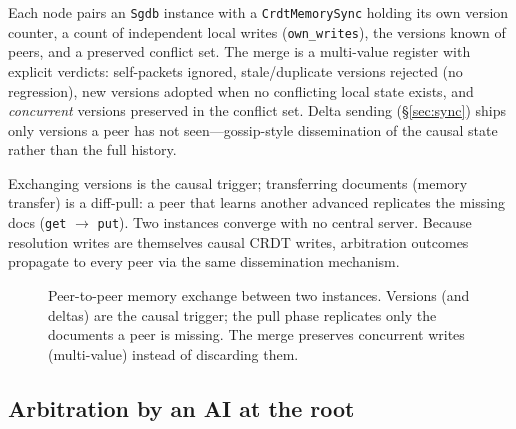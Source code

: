 \documentclass[11pt,twocolumn]{article}
\begin{document}
Each node pairs an \texttt{Sgdb} instance with a \texttt{CrdtMemorySync}
holding its own version counter, a count of independent local writes
(\texttt{own\_writes}), the versions known of peers, and a preserved conflict
set. The merge is a multi-value register with explicit verdicts:
self-packets ignored, stale/duplicate versions rejected (no regression), new
versions adopted when no conflicting local state exists, and \emph{concurrent}
versions preserved in the conflict set. Delta sending
(\S\ref{sec:sync}) ships only versions a peer has not seen---gossip-style
dissemination of the causal state rather than the full history.

Exchanging versions is the causal trigger; transferring documents (memory
transfer) is a diff-pull: a peer that learns another advanced replicates the
missing docs (\texttt{get} $\to$ \texttt{put}). Two instances converge with no
central server. Because resolution writes are themselves causal CRDT writes,
arbitration outcomes propagate to every peer via the same dissemination
mechanism.

\begin{figure}[t]
\centering
{}
\caption{Peer-to-peer memory exchange between two instances. Versions (and
deltas) are the causal trigger; the pull phase replicates only the documents a
peer is missing. The merge preserves concurrent writes (multi-value) instead of
discarding them.}
\label{fig:sync}
\end{figure}

\subsection{Arbitration by an AI at the root}
\label{sec:arbitration}
\end{document}
